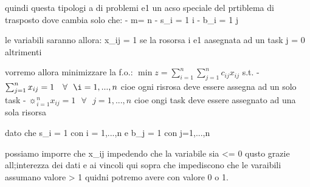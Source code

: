 quindi questa tipologi a di problemi e1 un acso speciale del prtiblema di trasposto dove cambia solo che:
- m= n
- s_i = 1 \forall i
- b_i = 1 \forall j


le variabili saranno allora:
x_{ij} = 1 se la rosorsa i e1 aasegnata ad un task j
= 0 altrimenti

vorremo allora minimizzare la f.o.: $\min z = \sum_{i=1}^n\sum_{j=1}^n c_{ij} x_{ij}$
s.t.
- $\sum_{j=1}^n x_{ij} = 1\ \ \ \forall\ \ \i=1,...,n$ cioe ogni risrosa deve essere assegna ad un solo task
- $\sun_{i=1}^n x_{ij} = 1\ \ \ \forall\ \ \ j=1,...,n$ cioe ongi task deve essere assegnato ad una sola risorsa

dato che s_i = 1 con i = 1,...,n e b_j = 1 con j=1,...,n

possiamo imporre che x_{ij}  impedendo che la variabile sia <= 0 qusto grazie all;interezza dei dati e ai vincoli qui sopra che impediscono che le varaibili assumano valore > 1 quidni potremo avere con valore 0 o 1.










